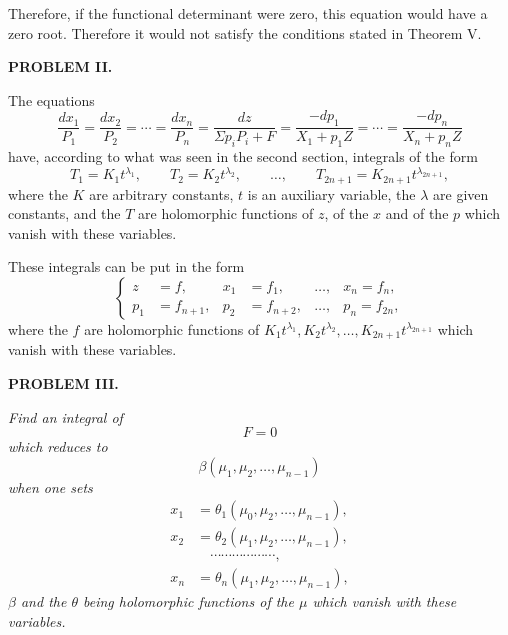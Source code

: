\documentclass[11pt]{article}
\begin{document}
Therefore, if the functional determinant were zero, this equation would have a zero root. Therefore it would not satisfy the conditions stated in Theorem V.

\begin{center}
{\bfseries PROBLEM II.}
\end{center}

The equations
\[
\frac{dx_1}{P_1}=\frac{dx_2}{P_2}=\cdots=\frac{dx_n}{P_n}
=\frac{dz}{\Sigma p_iP_i+F}
=\frac{-dp_1}{X_1+p_1Z}=\cdots=\frac{-dp_n}{X_n+p_nZ}
\]
have, according to what was seen in the second section, integrals of the form
\begin{equation*}\tag{34}
T_1=K_1t^{\lambda_1},\qquad T_2=K_2t^{\lambda_2},\qquad \ldots,\qquad T_{2n+1}=K_{2n+1}t^{\lambda_{2n+1}},
\end{equation*}
where the $K$ are arbitrary constants, $t$ is an auxiliary variable, the $\lambda$ are given constants, and the $T$ are holomorphic functions of $z$, of the $x$ and of the $p$ which vanish with these variables.

These integrals can be put in the form
\begin{equation*}\tag{35}
\left\{
\begin{aligned}
z&=f,& x_1&=f_1,& \ldots,& x_n=f_n,\\
p_1&=f_{n+1},& p_2&=f_{n+2},& \ldots,& p_n=f_{2n},
\end{aligned}
\right.
\end{equation*}
where the $f$ are holomorphic functions of $K_1t^{\lambda_1},K_2t^{\lambda_2},\ldots,K_{2n+1}t^{\lambda_{2n+1}}$ which vanish with these variables.

\begin{center}
{\bfseries PROBLEM III.}
\end{center}

\emph{Find an integral of}
\[
F=0
\]
\emph{which reduces to}
\[
\beta(\mu_1,\mu_2,\ldots,\mu_{n-1})
\]
\emph{when one sets}
\[
\begin{aligned}
x_1&=\theta_1(\mu_0,\mu_2,\ldots,\mu_{n-1}),\\
x_2&=\theta_2(\mu_1,\mu_2,\ldots,\mu_{n-1}),\\
&\hspace{1em}\cdots\cdots\cdots\cdots\cdots\cdots,\\
x_n&=\theta_n(\mu_1,\mu_2,\ldots,\mu_{n-1}),
\end{aligned}
\]
\emph{$\beta$ and the $\theta$ being holomorphic functions of the $\mu$ which vanish with these variables.}
\end{document}
